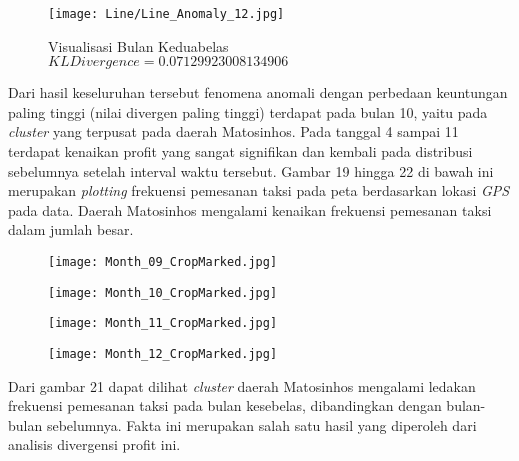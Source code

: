 \documentclass{article}
\begin{document}
\begin{figure}[H]
	\centering
	\texttt{[image: Line/Line\_Anomaly\_12.jpg]}
	\caption{Visualisasi Bulan Keduabelas\\$KL Divergence = 0.07129923008134906$}
\end{figure}

Dari hasil keseluruhan tersebut fenomena anomali dengan  perbedaan keuntungan paling tinggi (nilai divergen paling tinggi) terdapat pada bulan 10, yaitu pada \textit{cluster} yang terpusat pada daerah Matosinhos. Pada tanggal 4 sampai 11 terdapat kenaikan profit yang sangat signifikan dan kembali pada distribusi sebelumnya setelah interval waktu tersebut. Gambar 19 hingga 22 di bawah ini merupakan \textit{plotting} frekuensi pemesanan taksi pada peta berdasarkan lokasi \textit{GPS} pada data. Daerah Matosinhos mengalami kenaikan frekuensi pemesanan taksi dalam jumlah besar.

\begin{figure}[H]
	\centering
	\begin{minipage}{.4\textwidth}
		\centering
		\texttt{[image: Month\_09\_CropMarked.jpg]}
	\end{minipage}%
	\hspace{.1\textwidth}
	\begin{minipage}{.4\textwidth}
		\centering
		\texttt{[image: Month\_10\_CropMarked.jpg]}
	\end{minipage}%
\end{figure}

\begin{figure}[H]
	\centering
	\begin{minipage}{.4\textwidth}
		\centering
		\texttt{[image: Month\_11\_CropMarked.jpg]}
	\end{minipage}%
	\hspace{.1\textwidth}
	\begin{minipage}{.4\textwidth}
		\centering
		\texttt{[image: Month\_12\_CropMarked.jpg]}
	\end{minipage}%
\end{figure}

Dari gambar 21 dapat dilihat \textit{cluster} daerah Matosinhos mengalami ledakan frekuensi pemesanan taksi pada bulan kesebelas, dibandingkan dengan bulan-bulan sebelumnya. Fakta ini merupakan salah satu hasil yang diperoleh dari analisis divergensi profit ini.
\end{document}
